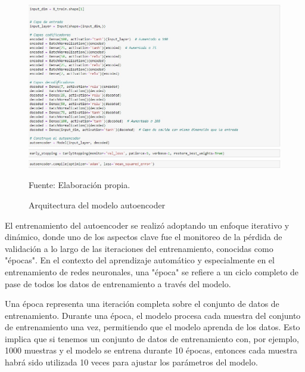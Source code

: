 \begin{figure}[H]
    \begin{minipage}[t]{0.9\textwidth}
        \caption{Arquitectura del modelo autoencoder}
        \label{arquitectura_autoencoder}        
    \end{minipage}

    \vspace{10pt}

    \begin{minipage}[b]{0.99\textwidth}
        \centering
        \includegraphics[width=\textwidth]{img/Arquitectura modelo autoencoder.jpg}        
    \end{minipage}

    \begin{minipage}[t]{0.9\textwidth}
        Fuente: Elaboración propia.
    \end{minipage}
\end{figure}

El entrenamiento del autoencoder se realizó adoptando un enfoque iterativo y dinámico, donde uno de los aspectos clave fue el monitoreo de la pérdida de validación a lo largo de las iteraciones del entrenamiento, conocidas como "épocas". En el contexto del aprendizaje automático y especialmente en el entrenamiento de redes neuronales, una "época" se refiere a un ciclo completo de pase de todos los datos de entrenamiento a través del modelo.

Una época representa una iteración completa sobre el conjunto de datos de entrenamiento. Durante una época, el modelo procesa cada muestra del conjunto de entrenamiento una vez, permitiendo que el modelo aprenda de los datos. Esto implica que si tenemos un conjunto de datos de entrenamiento con, por ejemplo, 1000 muestras y el modelo se entrena durante 10 épocas, entonces cada muestra habrá sido utilizada 10 veces para ajustar los parámetros del modelo.

